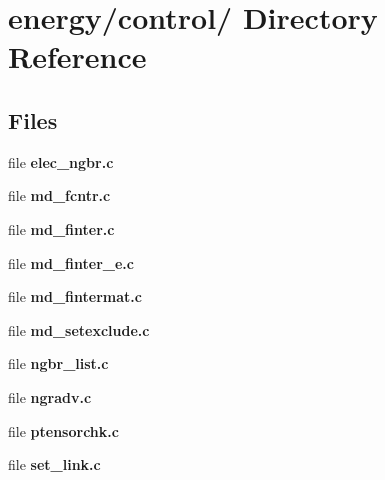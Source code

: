 \section{energy/control/ Directory Reference}
\label{dir_055cf9d055f690b268eef6637815ae1d}
\subsection*{Files}
\begin{CompactItemize}
\item 
file {\bf elec\_\-ngbr.c}
\item 
file {\bf md\_\-fcntr.c}
\item 
file {\bf md\_\-finter.c}
\item 
file {\bf md\_\-finter\_\-e.c}
\item 
file {\bf md\_\-fintermat.c}
\item 
file {\bf md\_\-setexclude.c}
\item 
file {\bf ngbr\_\-list.c}
\item 
file {\bf ngradv.c}
\item 
file {\bf ptensorchk.c}
\item 
file {\bf set\_\-link.c}
\end{CompactItemize}
